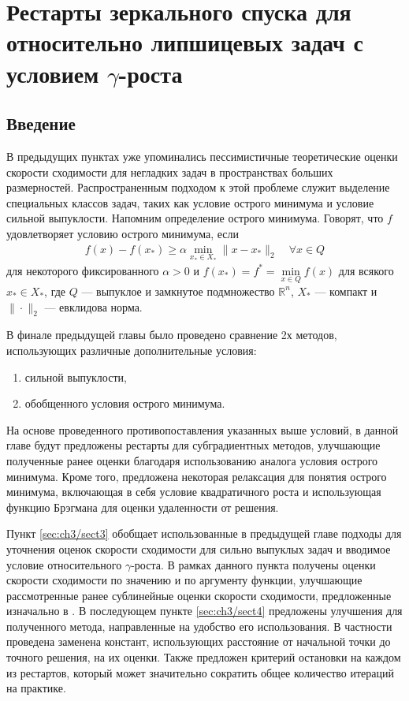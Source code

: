 \chapter{Рестарты зеркального спуска для относительно липшицевых задач с условием $\gamma$-роста}\label{ch:ch3}

\section{Введение}\label{sec:ch3/sect1}

    В предыдущих пунктах уже упоминались пессимистичные теоретические оценки скорости сходимости для негладких задач в пространствах больших размерностей. Распространенным подходом к этой проблеме служит выделение специальных классов задач, таких как условие острого минимума \cite{6, 1} и условие сильной выпуклости. Напомним определение острого минимума. Говорят, что $f$ удовлетворяет условию острого минимума, если
    \begin{gather}\label{sm}
    f(x) - f(x_*) \geq \alpha \min_{x_* \in X_*} \|x- x_*\|_2 \quad \forall x \in Q
    \end{gather}
    для некоторого фиксированного $\alpha >0$ и $f(x_*) = f^* = \min\limits_{x\in Q} f(x)$ для всякого $x_* \in X_*$, где $Q$ --- выпуклое и замкнутое подмножество $\mathbb{R}^n$, $X_*$ --- компакт и $\|\cdot\|_2$ --- евклидова норма. 

    В финале предыдущей главы было проведено сравнение 2х методов, использующих различные дополнительные условия:
    \begin{enumerate}
        \item сильной выпуклости,
        \item обобщенного условия острого минимума.
    \end{enumerate}
    На основе проведенного противопоставления указанных выше условий, в данной главе будут предложены рестарты для субградиентных методов, улучшающие полученные ранее оценки благодаря использованию аналога условия острого минимума.  Кроме того, предложена некоторая релаксация для понятия острого минимума, включающая в себя условие квадратичного роста и использующая функцию Брэгмана для оценки удаленности от решения. 
    
    Пункт \ref{sec:ch3/sect3} обобщает использованные в предыдущей главе подходы для уточнения оценок скорости сходимости для сильно выпуклых задач и вводимое условие относительного $\gamma$-роста. В рамках данного пункта получены оценки скорости сходимости по значению и по аргументу функции, улучшающие рассмотренные ранее сублинейные оценки скорости сходимости, предложенные изначально в \cite{Bach_2012}. В последующем пункте \ref{sec:ch3/sect4} предложены улучшения для полученного метода, направленные на удобство его использования. В частности проведена заменена констант, использующих расстояние от начальной точки до точного решения, на их оценки. Также предложен критерий остановки на каждом из рестартов, который может значительно сократить общее количество итераций на практике.

